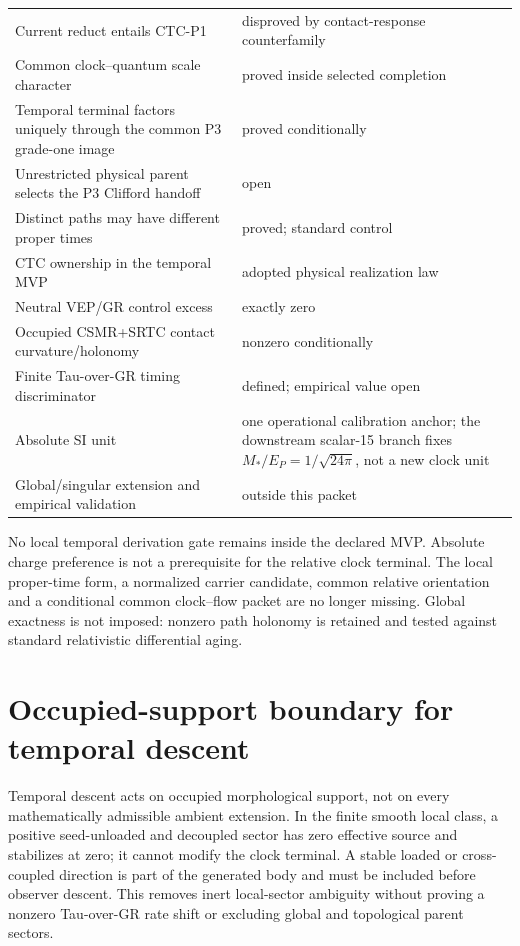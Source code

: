 \documentclass[11pt]{article}
\begin{document}
\begin{longtable}{L{.44\linewidth}L{.42\linewidth}}
Current reduct entails CTC-P1 & disproved by contact-response counterfamily\\
Common clock--quantum scale character & proved inside selected completion\\
Temporal terminal factors uniquely through the common P3 grade-one image & proved conditionally\\
Unrestricted physical parent selects the P3 Clifford handoff & open\\
Distinct paths may have different proper times & proved; standard control\\
CTC ownership in the temporal MVP & adopted physical realization law\\
Neutral VEP/GR control excess & exactly zero\\
Occupied CSMR+SRTC contact curvature/holonomy & nonzero conditionally\\
Finite Tau-over-GR timing discriminator & defined; empirical value open\\
Absolute SI unit & one operational calibration anchor; the downstream
scalar-15 branch fixes \(M_*/E_P=1/\sqrt{24\pi}\), not a new clock unit\\
Global/singular extension and empirical validation & outside this packet\\
\bottomrule
\end{longtable}
\endgroup

No local temporal derivation gate remains inside the declared MVP. Absolute
charge preference is not a prerequisite
for the relative clock terminal. The local proper-time form, a normalized
carrier candidate, common relative orientation and a conditional common
clock--flow packet are no longer missing. Global exactness is not imposed:
nonzero path holonomy is retained and tested against standard relativistic
differential aging.

\section{Occupied-support boundary for temporal descent}

Temporal descent acts on occupied morphological support, not on every
mathematically admissible ambient extension. In the finite smooth local class,
a positive seed-unloaded and decoupled sector has zero effective source and
stabilizes at zero; it cannot modify the clock terminal. A stable loaded or
cross-coupled direction is part of the generated body and must be included
before observer descent. This removes inert local-sector ambiguity without
proving a nonzero Tau-over-GR rate shift or excluding global and topological
parent sectors.
\end{document}
